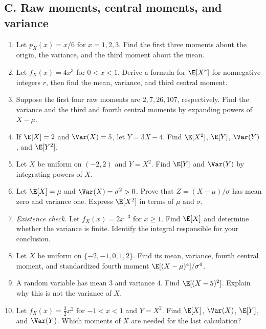 \subsection{C. Raw moments, central moments, and variance}
\begin{enumerate}[label=\textbf{C\arabic*.},leftmargin=*,itemsep=0.75em]
\item Let $p_X(x)=x/6$ for $x=1,2,3$. Find the first three moments about the origin, the variance, and the third moment about the mean.
\item Let $f_X(x)=4x^3$ for $0<x<1$. Derive a formula for $\E[X^r]$ for nonnegative integers $r$, then find the mean, variance, and third central moment.
\item Suppose the first four raw moments are $2,7,26,107$, respectively. Find the variance and the third and fourth central moments by expanding powers of $X-\mu$.
\item If $\E[X]=2$ and $\Var(X)=5$, let $Y=3X-4$. Find $\E[X^2]$, $\E[Y]$, $\Var(Y)$, and $\E[Y^2]$.
\item Let $X$ be uniform on $(-2,2)$ and $Y=X^2$. Find $\E[Y]$ and $\Var(Y)$ by integrating powers of $X$.
\item Let $\E[X]=\mu$ and $\Var(X)=\sigma^2>0$. Prove that $Z=(X-\mu)/\sigma$ has mean zero and variance one. Express $\E[X^2]$ in terms of $\mu$ and $\sigma$.
\item \textit{Existence check.} Let $f_X(x)=2x^{-3}$ for $x\geq1$. Find $\E[X]$ and determine whether the variance is finite. Identify the integral responsible for your conclusion.
\item Let $X$ be uniform on $\{-2,-1,0,1,2\}$. Find its mean, variance, fourth central moment, and standardized fourth moment $\E[(X-\mu)^4]/\sigma^4$.
\item A random variable has mean $3$ and variance $4$. Find $\E[(X-5)^2]$. Explain why this is not the variance of $X$.
\item Let $f_X(x)=\tfrac32x^2$ for $-1<x<1$ and $Y=X^2$. Find $\E[X]$, $\Var(X)$, $\E[Y]$, and $\Var(Y)$. Which moments of $X$ are needed for the last calculation?
\end{enumerate}

